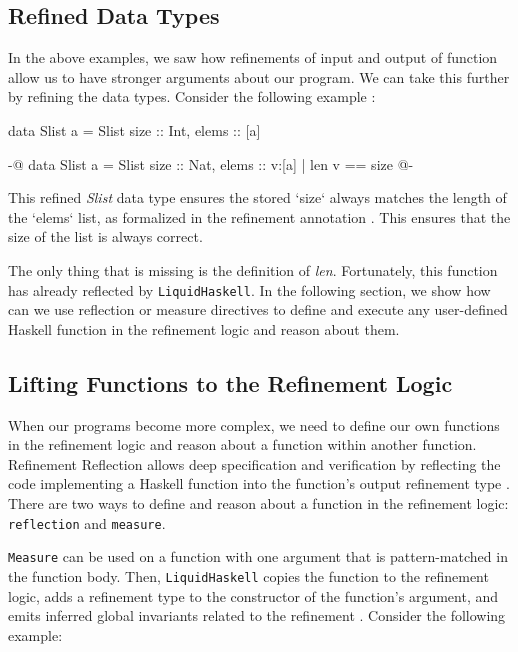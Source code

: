 \documentclass[]{rptuseminar}
\begin{document}
\subsection{Refined Data Types}
In the above examples, we saw how refinements of input and output of function allow us to have stronger arguments about our program. 
We can take this further by refining the data types. Consider the following example \cite{jhala_programming_2020}:

\begin{haskell}
  data Slist a = Slist { size :: Int, elems :: [a] }

  {-@ data Slist a = Slist { size :: Nat, elems :: {v:[a] | len v == size} } @-}
\end{haskell}

This refined \textit{Slist} data type ensures the stored `size` always matches the length of the `elems` list, 
as formalized in the refinement annotation \cite{jhala_programming_2020}. 
This ensures that the size of the list is always correct.

The only thing that is missing is the definition of \textit{len}. Fortunately, this function has already reflected by
\texttt{LiquidHaskell}. In the following section, we show how can we use reflection or measure directives to define and execute any user-defined Haskell function in the refinement logic and
reason about them.

\subsection{Lifting Functions to the Refinement Logic}
\label{sec:reflection}
When our programs become more complex, we need to define our own functions in the refinement logic and reason about
a function within another function. Refinement Reflection allows deep specification and verification by 
reflecting the code implementing a Haskell function into the function’s output refinement type \cite{niki_blog_2016}.
There are two ways to define and reason about a function in the refinement logic: \texttt{reflection} and \texttt{measure}. 

\texttt{Measure} can be used on a function with one argument that is pattern-matched in the function body. Then,
\texttt{LiquidHaskell} copies the function to the refinement logic, adds a refinement type to the constructor of the function's argument, and emits inferred global
invariants related to the refinement \cite{niki_lecture_2024}. Consider the following example:
\end{document}
